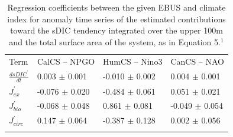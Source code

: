 \documentclass[hvmath, online,bgd]{copernicus_discussions}
\begin{document}
\clearpage
\begin{table}[t]
	\caption{Regression coefficients between the given EBUS and climate index for anomaly time series of the estimated contributions toward the sDIC tendency integrated over the upper 100m and the total surface area of the system, as in Equation 5.$^{1}$}
		\begin{tabular}{l l l l}
			\tophline
			Term & CalCS -- NPGO & HumCS -- Nino3 & CanCS -- NAO \\
			\middlehline
			$\frac{dsDIC^{\prime}}{dt}$ & 0.003 $\pm$ 0.001 & -0.010 $\pm$ 0.002 & 0.004 $\pm$ 0.001 \\
			$J^{\prime}_{ex}$  & -0.076 $\pm$  0.020 & -0.484 $\pm$ 0.061 & 0.051 $\pm$ 0.021 \\
			$J^{\prime}_{bio}$ & -0.068 $\pm$ 0.048 & 0.861 $\pm$ 0.081 & -0.049 $\pm$ 0.054 \\
			$J^{\prime}_{circ}$ & 0.147 $\pm$ 0.064 & -0.387 $\pm$ 0.128 & 0.002 $\pm$ 0.056 \\
			\bottomhline
		\end{tabular}
	\label{Table:3}
\end{table}
\end{document}
